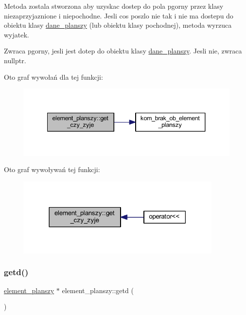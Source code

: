 Metoda zostala stworzona aby uzyskac dostep do pola pgorny przez klasy niezaprzyjaznione i niepochodne. Jesli cos poszlo nie tak i nie ma dostepu do obiektu klasy \mbox{\hyperlink{classdane__planszy}{dane\+\_\+planszy}} (lub obiektu klasy pochodnej), metoda wyrzuca wyjatek. \begin{DoxyReturn}{Zwraca}
pgorny, jesli jest dotep do obiektu klasy \mbox{\hyperlink{classdane__planszy}{dane\+\_\+planszy}}. Jesli nie, zwraca nullptr. 
\end{DoxyReturn}
Oto graf wywołań dla tej funkcji\+:
\nopagebreak
\begin{figure}[H]
\begin{center}
\leavevmode
\includegraphics[width=341pt]{classelement__planszy_affcc7904f806550088b5362691b7953d_cgraph}
\end{center}
\end{figure}
Oto graf wywoływań tej funkcji\+:
\nopagebreak
\begin{figure}[H]
\begin{center}
\leavevmode
\includegraphics[width=290pt]{classelement__planszy_affcc7904f806550088b5362691b7953d_icgraph}
\end{center}
\end{figure}
\mbox{\label{classelement__planszy_a7721a78d1a2a879eccfa37b43e5a6be6}} 
\subsubsection{\texorpdfstring{getd()}{getd()}}
{\footnotesize\ttfamily \mbox{\hyperlink{classelement__planszy}{element\+\_\+planszy}} $\ast$ element\+\_\+planszy\+::getd (\begin{DoxyParamCaption}{ }\end{DoxyParamCaption})}

